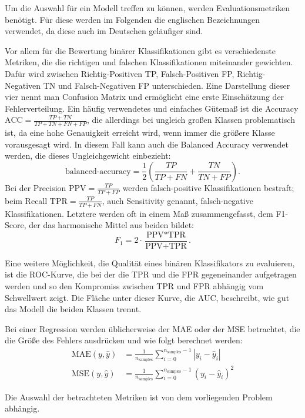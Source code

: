 	Um die Auswahl für ein Modell treffen zu können, werden Evaluationsmetriken benötigt. Für diese werden im Folgenden die englischen Bezeichnungen verwendet, da diese auch im Deutschen geläufiger sind.
	
	Vor allem für die Bewertung binärer Klassifikationen gibt es verschiedenste Metriken, die die richtigen und falschen Klassifikationen miteinander gewichten. Dafür wird zwischen Richtig-Positiven TP, Falsch-Positiven FP, Richtig-Negativen TN und Falsch-Negativen FP unterschieden. Eine Darstellung dieser vier nennt man Confusion Matrix und ermöglicht eine erste Einschätzung der Fehlerverteilung. Ein häufig verwendetes und einfaches Gütemaß ist die Accuracy $\text{ACC} = \frac{TP + TN}{TP + TN + FN + FP}$, die allerdings bei ungleich großen Klassen problematisch ist, da eine hohe Genauigkeit erreicht wird, wenn immer die größere Klasse vorausgesagt wird. In diesem Fall kann auch die Balanced Accuracy verwendet werden, die dieses Ungleichgewicht einbezieht:
	\[
		\text{balanced-accuracy} = \frac{1}{2}\left( \frac{TP}{TP + FN} + \frac{TN}{TN + FP}\right).
	\]
	 Bei der Precision $\text{PPV} = \frac{TP}{TP + FP}$ werden falsch-positive Klassifikationen \glqq bestraft\grqq{}; beim Recall $\text{TPR} = \frac{TP}{TP + FN}$, auch Sensitivity genannt, falsch-negative Klassifikationen. Letztere werden oft in einem Maß zusammengefasst, dem F1-Score, der das harmonische Mittel aus beiden bildet:
	\[
		F_1 = 2 \cdot \frac{\text{PPV} * \text{TPR}}{\text{PPV} + \text{TPR}}.
	\]
	
	Eine weitere Möglichkeit, die Qualität eines binären Klassifikators zu evaluieren, ist die \ac{ROC}-Kurve, die  bei der die \ac{TPR} und die \ac{FPR} gegeneinander aufgetragen werden und so den Kompromiss zwischen \ac{TPR} und \ac{FPR} abhängig vom Schwellwert zeigt. Die Fläche unter dieser Kurve, die \ac{AUC}, beschreibt, wie gut das Modell die beiden Klassen trennt.
	
	Bei einer Regression werden üblicherweise der \ac{MAE} oder der \ac{MSE} betrachtet, die die Größe des Fehlers ausdrücken und wie folgt berechnet werden:
	\begin{align*}
		\text{MAE}(y, \hat{y}) &= \frac{1}{n_{\text{samples}}} \sum_{i=0}^{n_{\text{samples}}-1} \left| y_i - \hat{y}_i \right| \\
		\text{MSE}(y, \hat{y}) &= \frac{1}{n_\text{samples}} \sum_{i=0}^{n_\text{samples} - 1} (y_i - \hat{y}_i)^2		
	\end{align*}
	
	Die Auswahl der betrachteten Metriken ist von dem vorliegenden Problem abhängig.

